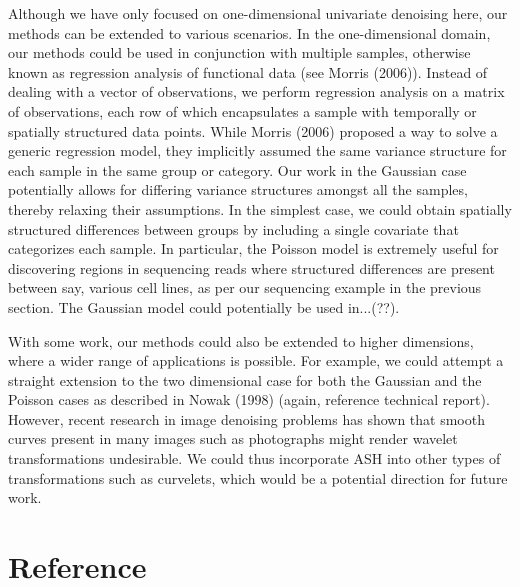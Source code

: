 \documentclass[12pt]{article}
\begin{document}
Although we have only focused on one-dimensional univariate denoising here, our methods can be extended to various scenarios. In the one-dimensional domain, our methods could be used in conjunction with multiple samples, otherwise known as regression analysis of functional data (see Morris (2006)). Instead of dealing with a vector of observations, we perform regression analysis on a matrix of observations, each row of which encapsulates a sample with temporally or spatially structured data points. While Morris (2006) proposed a way to solve a generic regression model, they implicitly assumed the same variance structure for each sample in the same group or category. Our work in the Gaussian case potentially allows for differing variance structures amongst all the samples, thereby relaxing their assumptions. In the simplest case, we could obtain spatially structured differences between groups by including a single covariate that categorizes each sample. In particular, the Poisson model is extremely useful for discovering regions in sequencing reads where structured differences are present between say, various cell lines, as per our sequencing example in the previous section. The Gaussian model could potentially be used in...(??).

With some work, our methods could also be extended to higher dimensions, where a wider range of applications is possible. For example, we could attempt a straight extension to the two dimensional case for both the Gaussian and the Poisson cases as described in Nowak (1998) (again, reference technical report). However, recent research in image denoising problems has shown that smooth curves present in many images such as photographs might render wavelet transformations undesirable. We could thus incorporate ASH into other types of transformations such as curvelets, which would be a potential direction for future work.
\newpage
\section{Reference}
\end{document}
